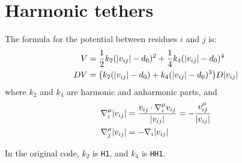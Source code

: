 \documentclass{article}
\DeclarePairedDelimiter{\p}{(}{)}
\DeclarePairedDelimiter{\norm}{\lvert}{\rvert}
\begin{document}
  \section*{Harmonic tethers}
  The formula for the potential between residues $i$ and $j$ is:
  \begin{align*}
    V &= \frac{1}{2}k_2 (\norm{v_{ij}}-d_0)^2 + \frac{1}{4}k_4 (\norm{v_{ij}}-d_0)^4\\
    DV &= \p*{k_2 (\norm{v_{ij}}-d_0) + k_4 (\norm{v_{ij}}-d_0)^3} D\norm{v_{ij}}
  \end{align*}
  where $k_2$ and $k_4$ are harmonic and anharmonic parts, and
  \begin{align*}
    \nabla_i^\mu \norm{v_{ij}} &= \frac{v_{ij} \cdot \nabla_i^\mu v_{ij}}{\norm{v_{ij}}} = -\frac{v_{ij}^\mu}{\norm{v_{ij}}}\\
    \nabla_j^\mu \norm{v_{ij}} &= -\nabla_i \norm{v_{ij}}
  \end{align*}

  In the original code, $k_2$ is {\tt H1}, and $k_4$ is {\tt HH1}.
\end{document}
